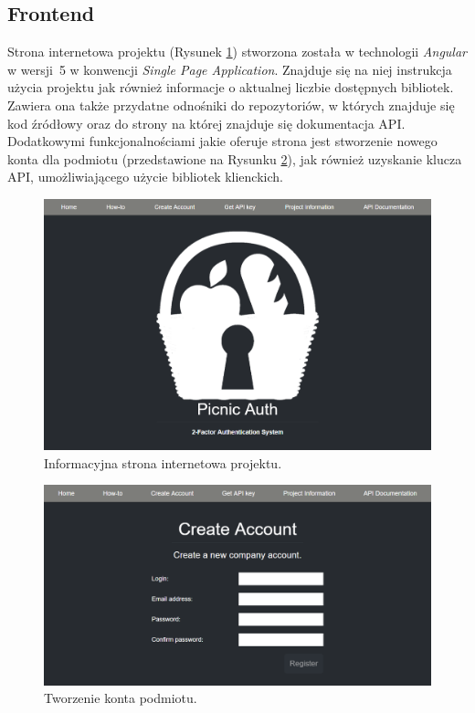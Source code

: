 \subsection{Frontend}
Strona internetowa projektu (Rysunek \ref{front-home}) stworzona została w technologii \textit{Angular} w wersji~5 w konwencji 
\textit{Single Page Application}. Znajduje się na niej instrukcja użycia projektu jak również informacje
o aktualnej liczbie dostępnych bibliotek. Zawiera ona także przydatne odnośniki do repozytoriów, w których
znajduje się kod źródłowy oraz do strony na której znajduje się dokumentacja API. \\
Dodatkowymi funkcjonalnościami jakie oferuje strona jest stworzenie nowego konta dla podmiotu 
(przedstawione na Rysunku \ref{front-create}), jak również uzyskanie klucza API, 
umożliwiającego użycie bibliotek klienckich.
\begin{figure}[t]
    \centering
	\includegraphics[width=\textwidth]{content/images/front-home}
    \caption{Informacyjna strona internetowa projektu.}
    \label{front-home}
\end{figure}
\begin{figure}[t]
    \centering
	\includegraphics[width=\textwidth]{content/images/front-create}
    \caption{Tworzenie konta podmiotu.}
    \label{front-create}
\end{figure}

